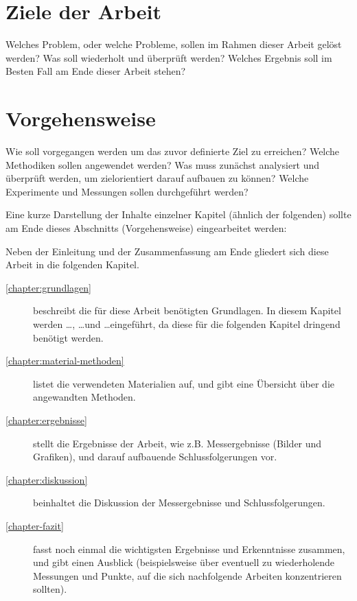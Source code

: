 \section{Ziele der Arbeit}

Welches Problem, oder welche Probleme, sollen im Rahmen dieser Arbeit gelöst werden? Was soll wiederholt und überprüft werden? Welches Ergebnis soll im Besten Fall am Ende dieser Arbeit stehen?

\section{Vorgehensweise}

Wie soll vorgegangen werden um das zuvor definierte Ziel zu erreichen? Welche Methodiken sollen angewendet werden? Was muss zunächst analysiert und überprüft werden, um zielorientiert darauf aufbauen zu können? Welche Experimente und Messungen sollen durchgeführt werden?

Eine kurze Darstellung der Inhalte einzelner Kapitel (ähnlich der folgenden) sollte am Ende dieses Abschnitts (Vorgehensweise) eingearbeitet werden:

Neben der Einleitung und der Zusammenfassung am Ende gliedert sich diese Arbeit in die folgenden Kapitel.
\begin{description}
  \item[\ref{chapter:grundlagen}] beschreibt die für diese Arbeit benötigten Grundlagen. In diesem Kapitel werden \ldots, \ldots und \ldots eingeführt, da diese für die folgenden Kapitel dringend benötigt werden.
  \item[\ref{chapter:material-methoden}] listet die verwendeten Materialien auf, und gibt eine Übersicht über die angewandten Methoden.
  \item[\ref{chapter:ergebnisse}] stellt die Ergebnisse der Arbeit, wie z.B. Messergebnisse (Bilder und Grafiken), und darauf aufbauende Schlussfolgerungen vor.
  \item[\ref{chapter:diskussion}] beinhaltet die Diskussion der Messergebnisse und Schlussfolgerungen.
  \item[\ref{chapter-fazit}] fasst noch einmal die wichtigsten Ergebnisse und Erkenntnisse zusammen, und gibt einen Ausblick (beispielsweise über eventuell zu wiederholende Messungen und Punkte, auf die sich nachfolgende Arbeiten konzentrieren sollten).
\end{description}

